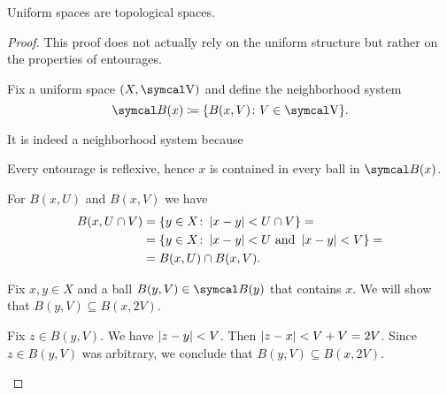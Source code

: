 \begin{proposition}\label{thm:uniform_spaces_are_topological}
  Uniform spaces are topological spaces.
\end{proposition}
\begin{proof}
  This proof does not actually rely on the uniform structure but rather on the properties of entourages.

  Fix a uniform space \( (X, \V) \) and define the neighborhood system
  \begin{equation*}
    \Cal{B}(x) \coloneqq \{ B(x, V) \colon V \in \V \}.
  \end{equation*}

  It is indeed a neighborhood system because
  \begin{description}
     Every entourage is reflexive, hence \( x \) is contained in every ball in \( \Cal{B}(x) \).

     For \( B(x, U) \) and \( B(x, V) \) we have
    \begin{align*}
      B(x, U \cap V)
      &=
      \{ y \in X \colon \left\vert x - y \right\vert < U \cap V \}
      = \\ &=
      \{ y \in X \colon \left\vert x - y \right\vert < U \text{ and } \left\vert x - y \right\vert < V \}
      = \\ &=
      B(x, U) \cap B(x, V).
    \end{align*}

     Fix \( x, y \in X \) and a ball \( B(y, V) \in \Cal{B}(y) \) that contains \( x \). We will show that \( B(y, V) \subseteq B(x, 2V) \).

    Fix \( z \in B(y, V) \). We have \( \left\vert z - y \right\vert < V \). Then \( \left\vert z - x \right\vert < V + V = 2V \). Since \( z \in B(y, V) \) was arbitrary, we conclude that \( B(y, V) \subseteq B(x, 2V) \).
  \end{description}
\end{proof}

